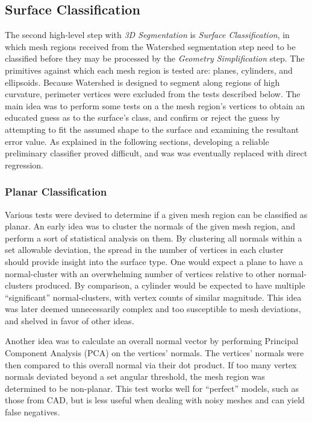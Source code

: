 \subsection{Surface Classification}
The second high-level step with \textit{3D Segmentation} is \textit{Surface Classification}, in which mesh regions received from the Watershed segmentation step need to be classified before they may be processed by the \textit{Geometry Simplification} step.
The primitives against which each mesh region is tested are: planes, cylinders, and ellipsoids.
Because Watershed is designed to segment along regions of high curvature, perimeter vertices were excluded from the tests described below.
The main idea was to perform some tests on a the mesh region's vertices to obtain an educated guess as to the surface's class, and confirm or reject the guess by attempting to fit the assumed shape to the surface and examining the resultant error value.
As explained in the following sections, developing a reliable preliminary classifier proved difficult, and was was eventually replaced with direct regression.

\subsubsection{Planar Classification}
Various tests were devised to determine if a given mesh region can be classified as planar.
An early idea was to cluster the normals of the given mesh region, and perform a sort of statistical analysis on them.
By clustering all normals within a set allowable deviation, the spread in the number of vertices in each cluster should provide insight into the surface type.
One would expect a plane to have a normal-cluster with an overwhelming number of vertices relative to other normal-clusters produced.
By comparison, a cylinder would be expected to have multiple ``significant'' normal-clusters, with vertex counts of similar magnitude.
This idea was later deemed unnecessarily complex and too susceptible to mesh deviations, and shelved in favor of other ideas.

Another idea was to calculate an overall normal vector by performing Principal Component Analysis (PCA) on the vertices' normals.
The vertices' normals were then compared to this overall normal via their dot product.
If too many vertex normals deviated beyond a set angular threshold, the mesh region was determined to be non-planar.
This test works well for ``perfect'' models, such as those from CAD, but is less useful when dealing with noisy meshes and can yield false negatives.

